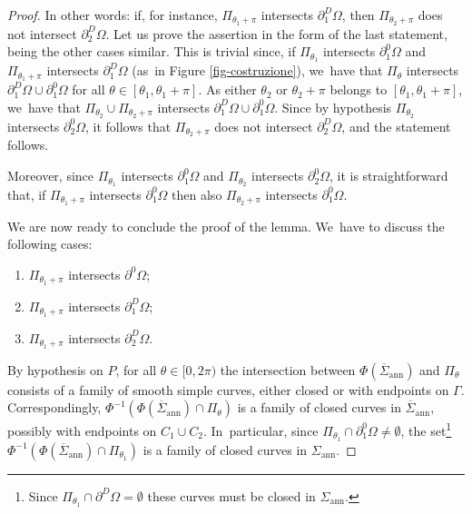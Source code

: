 \documentclass[JEP,XML,SOM,Unicode, NoFloatCountersInSection,published]{cedram}
\let\Om\Omega
\newcommand{\openannulus}{\Sigma_\mathrm{ann}}
\newcommand{\immclosedann}{\Phi({\overline\Sigma}_\mathrm{ann})}
\theoremstyle{definition}
\begin{document}
\begin{proof}
In other words: if, for instance, $\Pi_{\theta_1+\pi}$ intersects $\partial_1^D\Om$, then $\Pi_{\theta_2+\pi}$ does not intersect $\partial_2^D\Om$. Let us prove the assertion in the form of the last statement, being the other
cases similar. This is trivial since, if $\Pi_{\theta_1}$ intersects $\partial_1^0\Om$ and $\Pi_{\theta_1+\pi}$ intersects $\partial_1^D\Om$ (as~in Figure \ref{fig-costruzione}), we~have that $\Pi_{\theta}$ intersects $\partial_1^D\Om\cup\partial_1^0\Om$ for all $\theta\in [\theta_1,\theta_1+\pi]$. As either $\theta_2$ or $\theta_2+\pi$ belongs to $[\theta_1,\theta_1+\pi]$, we~have that $\Pi_{\theta_2}\cup\Pi_{\theta_2+\pi}$ intersects $\partial_1^D\Om\cup\partial_1^0\Om$. Since by hypothesis $\Pi_{\theta_2}$ intersects $\partial_2^0\Om$, it follows that $\Pi_{\theta_2+\pi}$ does not intersect $\partial_2^D\Om$, and the statement follows.

Moreover, since $\Pi_{\theta_1}$ intersects $\partial^0_1\Om$ and $\Pi_{\theta_2}$ intersects $\partial^0_2\Om$, it is straightforward that, if $\Pi_{\theta_1+\pi}$ intersects $\partial_1^0\Om$ then also $\Pi_{\theta_2+\pi}$ intersects $\partial_1^0\Om$.

We are now ready to conclude the proof of the lemma. We~have to discuss the following cases:
\begin{enumerate}[(1),wide]
\item\label{case:new1}
$\Pi_{\theta_1+\pi}$ intersects $\partial^0\Om$;
\item\label{case:new2}
$\Pi_{\theta_1+\pi}$ intersects $\partial_1^D\Om$;
\item\label{case:new3}
$\Pi_{\theta_1+\pi}$ intersects $\partial_2^D\Om$.
\end{enumerate}
By hypothesis on $P$, for all $\theta\in[0,2\pi)$ the intersection between $\immclosedann$ and $\Pi_\theta$ consists of a
family of smooth simple curves, either closed or with endpoints on $\Gamma$. Correspondingly, $\Phi^{-1}(\immclosedann\cap \Pi_\theta)$ is a family of closed curves in
$\overline\Sigma_\mathrm{ann}$, possibly with endpoints on $C_1\cup C_2$.
In~particular, since $\Pi_{\theta_1} \cap \partial^0_1\Om \neq \emptyset$, the set\footnote{Since $\Pi_{\theta_1} \cap \partial^D\Om = \emptyset$ these curves must be closed in $\openannulus$.} $\Phi^{-1}
(\immclosedann\cap \Pi_{\theta_1})$ is a family of closed curves in $\openannulus$.


\end{proof}
\end{document}

